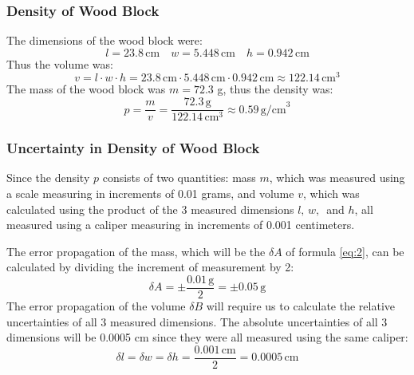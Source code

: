 \documentclass{article}
\begin{document}
\subsubsection{Density of Wood Block}
The dimensions of the wood block were:
\[ l = 23.8\,\mathrm{cm} \quad w = 5.448\,\mathrm{cm} \quad  h = 0.942\,\mathrm{cm}\]
Thus the volume was:
\[ 
    v = 
    l\cdot w \cdot h = 
    23.8\,\mathrm{cm} \cdot 5.448\,\mathrm{cm} \cdot 0.942\,\mathrm{cm} 
    \approx122.14\,\mathrm{cm}^3
\]
The mass of the wood block was $m=72.3$ g, thus the density was:
\[
    p = \frac{m}{v} = \frac{72.3\,\mathrm{g}}{122.14\,\mathrm{cm}^3} \approx 0.59 \,\mathrm{g/cm}^3    
\]
\subsubsection{Uncertainty in Density of Wood Block}
Since the density $p$ consists of two quantities: mass $m$, which was measured using a scale 
measuring in increments of 0.01 grams, and volume $v$, which was calculated using the product of 
the 3 measured dimensions $l,\,w,\,$ and $h$, all measured using a caliper measuring in increments 
of 0.001 centimeters. 

The error propagation of the mass, which will be the $\delta A$ of formula \eqref{eq:2}, 
can be calculated by dividing the increment of measurement by 2:
\[ \delta A = \pm\frac{0.01\,\mathrm{g}}{2} = \pm0.05\,\mathrm{g} \]
The error propagation of the volume $\delta B$ will require us to calculate the relative uncertainties
of all 3 measured dimensions. The absolute uncertainties of all 3 dimensions will be 0.0005 cm since
they were all measured using the same caliper:
\[ \delta l = \delta w = \delta h = \frac{0.001\,\mathrm{cm}}{2} = 0.0005\,\mathrm{cm} \]
\end{document}
